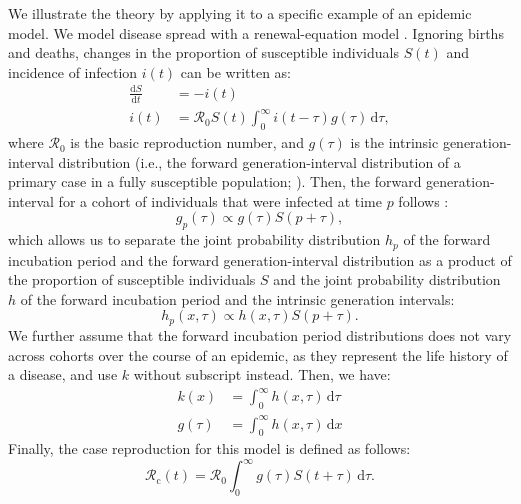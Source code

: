 \documentclass[12pt]{article}
\newcommand{\Rx}[1]{\ensuremath{{\mathcal R}_{#1}}\xspace}
\newcommand{\Ro}{\Rx{0}}
\newcommand{\Rc}{\Rx{\mathrm{c}}}
\newcommand{\dd}[1]{\ensuremath{\, \mathrm{d}#1}}
\newcommand{\dtau}{\dd{\tau}}
\newcommand{\dx}{\dd{x}}
\newcommand{\pt}{p} %
\newcommand{\gdist}{g} %
\begin{document}
We illustrate the theory by applying it to a specific example of an epidemic model. 
We model disease spread with a renewal-equation model \citep{heesterbeek1996concept, diekmann2000mathematical, roberts2004modelling, aldis2005integral, roberts2007model, champredon2018equivalence}.
Ignoring births and deaths, changes in the proportion of susceptible individuals $S(t)$ and incidence of infection $i(t)$ can be written as:
\begin{equation}
\begin{aligned}
\frac{\mathrm{d}S}{\mathrm{d}t} &= - i(t)\\
i(t) &= \Ro S(t) \int_0^\infty i(t-\tau) \gdist(\tau) \dtau,
\end{aligned}
\label{eq:renewal}
\end{equation}
where \Ro is the basic reproduction number, and $\gdist(\tau)$ is the intrinsic generation-interval distribution (i.e., the forward generation-interval distribution of a primary case in a fully susceptible population; \cite{champredon2015intrinsic}).
Then, the forward generation-interval for a cohort of individuals that were infected at time $\pt$ follows \citep{champredon2015intrinsic}:
\begin{equation}
\gdist_\pt (\tau) \propto \gdist(\tau) S(\pt + \tau),
\end{equation}
which allows us to separate the joint probability distribution $h_\pt$ of the forward incubation period and the forward generation-interval distribution as a product of the proportion of susceptible individuals $S$ and the joint probability distribution $h$ of the forward incubation period and the intrinsic generation intervals:
\begin{equation}
h_\pt (x, \tau) \propto h(x, \tau) S(\pt + \tau).
\end{equation}
We further assume that the forward incubation period distributions does not vary across cohorts over the course of an epidemic, as they represent the life history of a disease, and use $k$ without subscript instead. 
Then, we have:
\begin{equation}
\begin{aligned}
k(x) &= \int_0^\infty h(x, \tau) \dtau\\
\gdist(\tau) &= \int_0^\infty h(x, \tau) \dx
\end{aligned}
\end{equation}
Finally, the case reproduction for this model is defined as follows:
\begin{equation}
\Rc(t) = \Ro \int_0^\infty \gdist(\tau) S(t+\tau) \dtau.
\end{equation}
\end{document}
